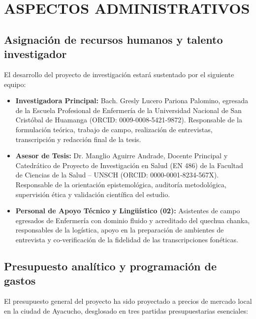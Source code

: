 \section{ASPECTOS ADMINISTRATIVOS}
\label{sec:cap5_administrativos}

\subsection{Asignación de recursos humanos y talento investigador}
\label{sec:5.1_recursos}
El desarrollo del proyecto de investigación estará sustentado por el siguiente equipo:
\begin{itemize}
    \item \textbf{Investigadora Principal:} Bach. Gresly Lucero Pariona Palomino, egresada de la Escuela Profesional de Enfermería de la Universidad Nacional de San Cristóbal de Huamanga (ORCID: 0009-0008-5421-9872). Responsable de la formulación teórica, trabajo de campo, realización de entrevistas, transcripción y redacción final de la tesis.
    \item \textbf{Asesor de Tesis:} Dr. Manglio Aguirre Andrade, Docente Principal y Catedrático de Proyecto de Investigación en Salud (EN 486) de la Facultad de Ciencias de la Salud -- UNSCH (ORCID: 0000-0001-8234-567X). Responsable de la orientación epistemológica, auditoría metodológica, supervisión ética y validación científica del estudio.
    \item \textbf{Personal de Apoyo Técnico y Lingüístico (02):} Asistentes de campo egresados de Enfermería con dominio fluido y acreditado del quechua chanka, responsables de la logística, apoyo en la preparación de ambientes de entrevista y co-verificación de la fidelidad de las transcripciones fonéticas.
\end{itemize}

\subsection{Presupuesto analítico y programación de gastos}
\label{sec:5.2_presupuesto}
El presupuesto general del proyecto ha sido proyectado a precios de mercado local en la ciudad de Ayacucho, desglosado en tres partidas presupuestarias esenciales:

